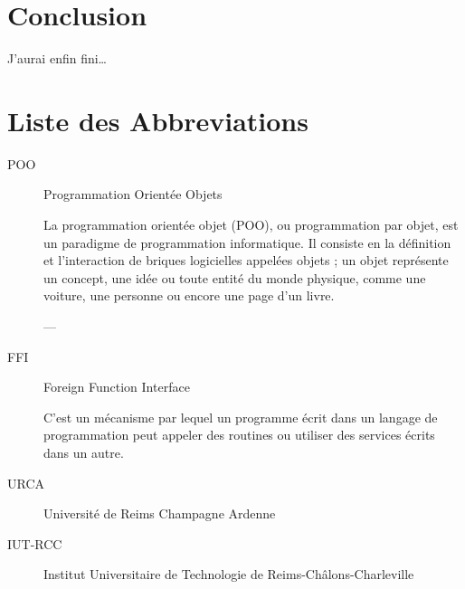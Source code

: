 \documentclass[11pt,a4paper,krantz2,11pt,oneside]{krantz}
\begin{document}
\hypertarget{conclusion}{%
\chapter*{Conclusion}\label{conclusion}}


J'aurai enfin fini\ldots{}

\hypertarget{liste-des-abbreviations}{%
\chapter*{Liste des Abbreviations}\label{liste-des-abbreviations}}


\begin{description}
\item[POO]
Programmation Orientée Objets

La programmation orientée objet (POO), ou programmation par objet, est un paradigme de programmation informatique. Il consiste en la définition et l'interaction de briques logicielles appelées objets ; un objet représente un concept, une idée ou toute entité du monde physique, comme une voiture, une personne ou encore une page d'un livre.

--- \citep{wikipedia_programmation_2020}
\item[FFI]
Foreign Function Interface

C'est un mécanisme par lequel un programme écrit dans un langage de programmation peut appeler des routines ou utiliser des services écrits dans un autre.
\item[URCA]
Université de Reims Champagne Ardenne
\item[IUT-RCC]
Institut Universitaire de Technologie de Reims-Châlons-Charleville
\end{description}

\backmatter



\printindex
\end{document}

